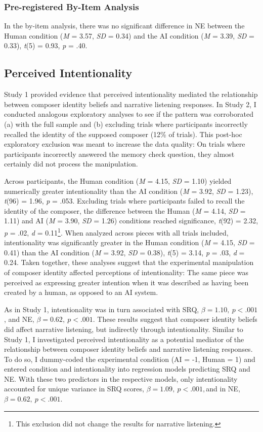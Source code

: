 \documentclass[12pt,twoside]{reedthesis}
\begin{document}
\subsubsection*{Pre-registered By-Item Analysis}
In the by-item analysis, there was no significant difference in NE between the Human condition (\emph{M} = 3.57, \emph{SD} = 0.34) and the AI condition (\emph{M} = 3.39, \emph{SD} = 0.33), \emph{t}(5) = 0.93, \emph{p} = .40. 

\subsection{Perceived Intentionality}
Study 1 provided evidence that perceived intentionality mediated the relationship between composer identity beliefs and narrative listening responses. In Study 2, I conducted analogous exploratory analyses to see if the pattern was corroborated (a) with the full sample and (b) excluding trials where participants incorrectly recalled the identity of the supposed composer (12\% of trials). This post-hoc exploratory exclusion was meant to increase the data quality: On trials where participants incorrectly answered the memory check question, they almost certainly did not process the manipulation.

Across participants, the Human condition (\emph{M} = 4.15, \emph{SD} = 1.10) yielded numerically greater intentionality than the AI condition (\emph{M} = 3.92, \emph{SD} = 1.23), \emph{t}(96) = 1.96, \emph{p} = .053. Excluding trials where participants failed to recall the identity of the composer, the difference between the Human (\emph{M} = 4.14, \emph{SD} = 1.11) and AI (\emph{M} = 3.90, \emph{SD} = 1.26) conditions reached significance, \emph{t}(92) = 2.32, \emph{p} = .02, \emph{d} = 0.11\footnote{This exclusion did not change the results for narrative listening.}. When analyzed across pieces with all trials included, intentionality was significantly greater in the Human condition (\emph{M} = 4.15, \emph{SD}  = 0.41) than the AI condition (\emph{M} = 3.92, \emph{SD} = 0.38), \emph{t}(5) = 3.14, \emph{p} = .03, \emph{d} = 0.24. Taken together, these analyses suggest that the experimental manipulation of composer identity affected perceptions of intentionality: The same piece was perceived as expressing greater intention when it was described as having been created by a human, as opposed to an AI system. 

As in Study 1, intentionality was in turn associated with SRQ, $\beta = 1.10, \:p < .001$, and NE, $ \beta = 0.62, \:p < .001$. These results suggest that composer identity beliefs did affect narrative listening, but indirectly through intentionality. Similar to Study 1, I investigated perceived intentionality as a potential mediator of the relationship between composer identity beliefs and narrative listening responses. To do so, I dummy-coded the experimental condition (AI = -1, Human = 1) and entered condition and intentionality into regression models predicting SRQ and NE. With these two predictors in the respective models, only intentionality accounted for unique variance in SRQ scores, $\beta = 1.09, \:p < .001, $and in NE, $ \beta = 0.62, \:p < .001$. 
\end{document}

